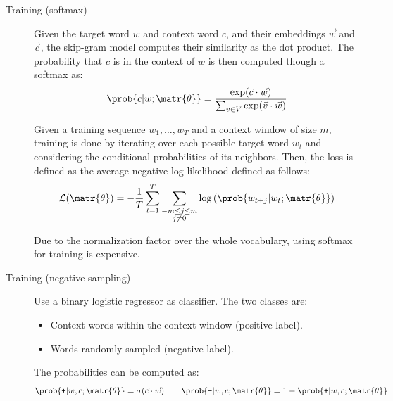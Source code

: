 \begin{description}
\begin{description}
                \begin{description}
                    \item[Training (softmax)]
                        Given the target word $w$ and context word $c$, and their embeddings $\vec{w}$ and $\vec{c}$, the skip-gram model computes their similarity as the dot product. The probability that $c$ is in the context of $w$ is then computed though a softmax as:
                        \[ 
                            \prob{c | w; \matr{\theta}} = \frac{\exp(\vec{c} \cdot \vec{w})}{\sum_{v \in V} \exp(\vec{v} \cdot \vec{w})}
                        \]

                        Given a training sequence $w_1, \dots, w_T$ and a context window of size $m$, training is done by iterating over each possible target word $w_t$ and considering the conditional probabilities of its neighbors. Then, the loss is defined as the average negative log-likelihood defined as follows:
                        \[
                            \begin{split}
                                \mathcal{L}(\matr{\theta}) = -\frac{1}{T} \sum_{t=1}^{T} \sum\limits_{\substack{-m \leq j \leq m\\j \neq 0}} \log\left( \prob{w_{t+j} | w_t; \matr{\theta}} \right)
                            \end{split}
                        \]

                        \begin{remark}
                            Due to the normalization factor over the whole vocabulary, using softmax for training is expensive.
                        \end{remark}

                    \item[Training (negative sampling)] 
                        Use a binary logistic regressor as classifier. The two classes are:
                        \begin{itemize}
                            \item Context words within the context window (positive label).
                            \item Words randomly sampled (negative label).
                        \end{itemize} 
                        The probabilities can be computed as:
                        \[ 
                            \prob{\texttt{+} | w, c; \matr{\theta}} = \sigma(\vec{c} \cdot \vec{w}) 
                            \qquad
                            \prob{\texttt{-} | w, c; \matr{\theta}} = 1 - \prob{\texttt{+} | w, c; \matr{\theta}}
                        \]


\end{description}
\end{description}
\end{description}
